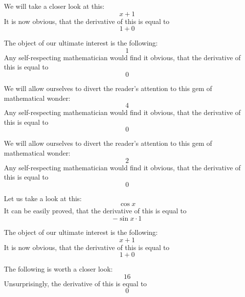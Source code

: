 \documentclass{article}
\begin{document}
We will take a closer look at this:
\begin{equation}
x + 1 
\end{equation}
It is now obvious, that the derivative of this is equal to
\begin{equation}
1 + 0 
\end{equation}

The object of our ultimate interest is the following:
\begin{equation}
1 
\end{equation}
Any self-respecting mathematician would find it obvious, that the derivative of this is equal to
\begin{equation}
0 
\end{equation}

We will allow ourselves to divert the reader's attention to this gem of mathematical wonder:
\begin{equation}
4 
\end{equation}
Any self-respecting mathematician would find it obvious, that the derivative of this is equal to
\begin{equation}
0 
\end{equation}

We will allow ourselves to divert the reader's attention to this gem of mathematical wonder:
\begin{equation}
2 
\end{equation}
Any self-respecting mathematician would find it obvious, that the derivative of this is equal to
\begin{equation}
0 
\end{equation}

Let us take a look at this:
\begin{equation}
\cos x 
\end{equation}
It can be easily proved, that the derivative of this is equal to
\begin{equation}
-\sin x \cdot 1 
\end{equation}

The object of our ultimate interest is the following:
\begin{equation}
x + 1 
\end{equation}
It is now obvious, that the derivative of this is equal to
\begin{equation}
1 + 0 
\end{equation}

The following is worth a closer look:
\begin{equation}
16 
\end{equation}
Unsurprisingly, the derivative of this is equal to
\begin{equation}
0 
\end{equation}
\end{document}
